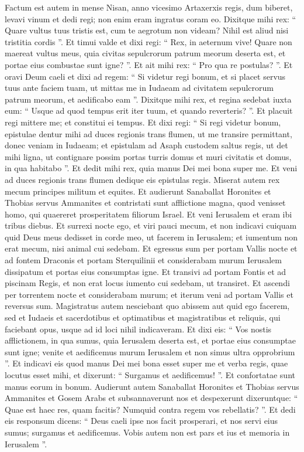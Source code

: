 \begin{biblechapter}
\begin{biblechapter}
\verse Factum est autem in mense Nisan, anno vicesimo Artaxerxis regis, dum biberet, levavi vinum et dedi regi; non enim eram ingratus coram eo. 
\verse Dixitque mihi rex: “ Quare vultus tuus tristis est, cum te aegrotum non videam? Nihil est aliud nisi tristitia cordis ”. Et timui valde 
\verse et dixi regi: “ Rex, in aeternum vive! Quare non maereat vultus meus, quia civitas sepulcrorum patrum meorum deserta est, et portae eius combustae sunt igne? ”. 
\verse Et ait mihi rex: “ Pro qua re postulas? ”. Et oravi Deum caeli 
\verse et dixi ad regem: “ Si videtur regi bonum, et si placet servus tuus ante faciem tuam, ut mittas me in Iudaeam ad civitatem sepulcrorum patrum meorum, et aedificabo eam ”.
 \verse Dixitque mihi rex, et regina sedebat iuxta eum: “ Usque ad quod tempus erit iter tuum, et quando reverteris? ”. Et placuit regi mittere me; et constitui ei tempus. 
\verse Et dixi regi: “ Si regi videtur bonum, epistulae dentur mihi ad duces regionis trans flumen, ut me transire permittant, donec veniam in Iudaeam; 
\verse et epistulam ad Asaph custodem saltus regis, ut det mihi ligna, ut contignare possim portas turris domus et muri civitatis et domus, in qua habitabo ”. Et dedit mihi rex, quia manus Dei mei bona super me.
 \verse Et veni ad duces regionis trans flumen dedique eis epistulas regis. Miserat autem rex mecum principes militum et equites. 
\verse Et audierunt Sanaballat Horonites et Thobias servus Ammanites et contristati sunt afflictione magna, quod venisset homo, qui quaereret prosperitatem filiorum Israel.
 \verse Et veni Ierusalem et eram ibi tribus diebus. 
\verse Et surrexi nocte ego, et viri pauci mecum, et non indicavi cuiquam quid Deus meus dedisset in corde meo, ut facerem in Ierusalem; et iumentum non erat mecum, nisi animal cui sedebam. 
 \verse Et egressus sum per portam Vallis nocte et ad fontem Draconis et portam Sterquilinii et considerabam murum Ierusalem dissipatum et portas eius consumptas igne. 
\verse Et transivi ad portam Fontis et ad piscinam Regis, et non erat locus iumento cui sedebam, ut transiret. 
\verse Et ascendi per torrentem nocte et considerabam murum; et iterum veni ad portam Vallis et reversus sum.
 \verse Magistratus autem nesciebant quo abissem aut quid ego facerem, sed et Iudaeis et sacerdotibus et optimatibus et magistratibus et reliquis, qui faciebant opus, usque ad id loci nihil indicaveram. 
\verse Et dixi eis: “ Vos nostis afflictionem, in qua sumus, quia Ierusalem deserta est, et portae eius consumptae sunt igne; venite et aedificemus murum Ierusalem et non simus ultra opprobrium ”. 
\verse Et indicavi eis quod manus Dei mei bona esset super me et verba regis, quae locutus esset mihi, et dixerunt: “ Surgamus et aedificemus! ”. Et confortatae sunt manus eorum in bonum. 
\verse Audierunt autem Sanaballat Horonites et Thobias servus Ammanites et Gosem Arabs et subsannaverunt nos et despexerunt dixeruntque: “ Quae est haec res, quam facitis? Numquid contra regem vos rebellatis? ”. 
\verse Et dedi eis responsum dicens: “ Deus caeli ipse nos facit prosperari, et nos servi eius sumus; surgamus et aedificemus. Vobis autem non est pars et ius et memoria in Ierusalem ”.
 

\end{biblechapter}
\end{biblechapter}
